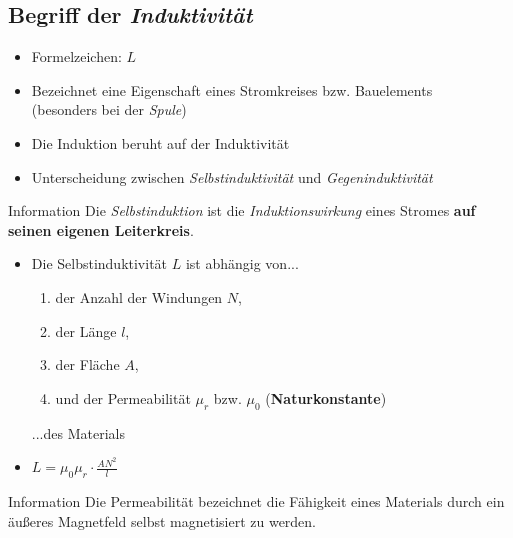 \subsection{Begriff der \textit{Induktivität}}
\begin{frame}
    \makeframetitle
    \begin{itemize}
        \item Formelzeichen: $L$
        \item Bezeichnet eine Eigenschaft eines Stromkreises bzw. Bauelements\\
            (besonders bei der \textit{Spule})
        \item Die Induktion beruht auf der Induktivität
        \item Unterscheidung zwischen \textit{Selbstinduktivität} und \textit{Gegeninduktivität}
    \end{itemize}
    \begin{block}{Information}
        Die \textit{Selbstinduktion} ist die \textit{Induktionswirkung} eines
        Stromes \textbf{auf seinen eigenen Leiterkreis}.
    \end{block}

\end{frame}

\begin{frame}
    \makeframetitle
    \begin{itemize}
        \item Die Selbstinduktivität $L$ ist abhängig von...
            \begin{enumerate}
                \item der Anzahl der Windungen $N$,
                \item der Länge $l$,
                \item der Fläche $A$,
                \item und der Permeabilität $\mu_r$ bzw. $\mu_0$
                    (\textbf{Naturkonstante})
            \end{enumerate}
          ...des Materials
          \item[\ding{212}] $L = \mu_0\mu_r \cdot \frac{AN^2}{l}$
    \end{itemize}
    \pause
    \begin{block}{Information}
         Die Permeabilität bezeichnet die Fähigkeit eines Materials durch ein äußeres Magnetfeld
         selbst magnetisiert zu werden.
    \end{block}
\end{frame}

